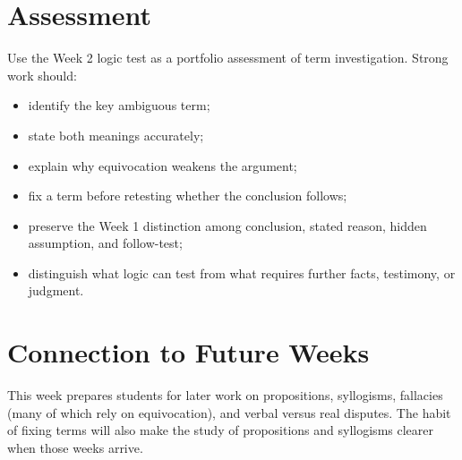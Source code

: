 \documentclass[12pt]{article}
\begin{document}
\section*{Assessment}
Use the Week 2 logic test as a portfolio assessment of term investigation. Strong work should:
\begin{itemize}[leftmargin=*]
\item identify the key ambiguous term;
\item state both meanings accurately;
\item explain why equivocation weakens the argument;
\item fix a term before retesting whether the conclusion follows;
\item preserve the Week 1 distinction among conclusion, stated reason, hidden assumption, and follow-test;
\item distinguish what logic can test from what requires further facts, testimony, or judgment.
\end{itemize}

\section*{Connection to Future Weeks}
This week prepares students for later work on propositions, syllogisms, fallacies (many of which rely on equivocation), and verbal versus real disputes. The habit of fixing terms will also make the study of propositions and syllogisms clearer when those weeks arrive.
\end{document}
